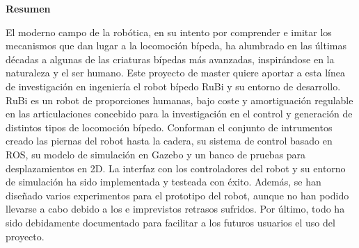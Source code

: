 \newenvironment{resumen}%
    {\null\vfill\begin{center}%
    \bfseries Resumen\end{center}}%
    {\vfill\null}
        \begin{resumen}
        El moderno campo de la robótica, en su intento por comprender e imitar los mecanismos que dan lugar a la locomoción bípeda, ha alumbrado en las últimas décadas a algunas de las criaturas bípedas más avanzadas, inspirándose en la naturaleza y el ser humano.
        Este proyecto de master quiere aportar a esta línea de investigación en ingeniería el robot bípedo RuBi y su entorno de desarrollo.
        RuBi es un robot de proporciones humanas, bajo coste y amortiguación regulable en las articulaciones concebido para la investigación en el control y generación de distintos tipos de locomoción bípedo.
        Conforman el conjunto de intrumentos creado las piernas del robot hasta la cadera, su sistema de control basado en ROS, su modelo de simulación en Gazebo y un banco de pruebas para desplazamientos en 2D.
        La interfaz con los controladores del robot y su entorno de simulación ha sido implementada y testeada con éxito.
        Además, se han diseñado varios experimentos para el prototipo del robot, aunque no han podido llevarse a cabo debido a los e imprevistos retrasos sufridos.
        Por último, todo ha sido debidamente documentado para facilitar a los futuros usuarios el uso del proyecto.
        \end{resumen}